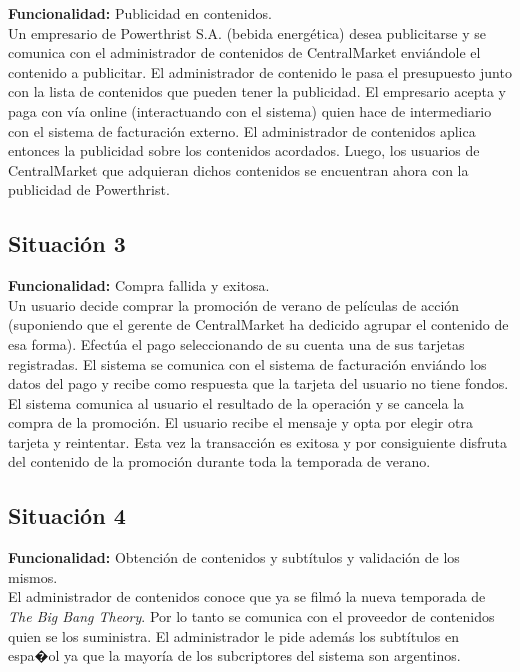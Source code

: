 \documentclass[11pt, a4paper, spanish]{article}
\begin{document}
	\textbf{Funcionalidad:} Publicidad en contenidos.\\

        Un empresario de Powerthrist S.A. (bebida energ\'etica) desea publicitarse y se comunica con el administrador de contenidos de CentralMarket 
    envi\'andole el contenido a publicitar.
    El administrador de contenido le pasa el presupuesto junto con la lista de contenidos que pueden tener la publicidad.
    El empresario acepta y paga con v\'ia online (interactuando con el sistema) quien hace de intermediario con el sistema de facturaci\'on externo.
    El administrador de contenidos aplica entonces la publicidad sobre los contenidos acordados.
    Luego, los usuarios de CentralMarket que adquieran dichos contenidos se encuentran ahora con la publicidad de Powerthrist.

\subsection{Situaci\'on 3}

	\textbf{Funcionalidad:} Compra fallida y exitosa.\\

        Un usuario decide comprar la promoci\'on de verano de pel\'iculas de acci\'on (suponiendo que el gerente de CentralMarket ha dedicido agrupar el     
    contenido de esa forma). Efect\'ua el pago seleccionando de su cuenta una de sus tarjetas registradas. El sistema se comunica con el sistema de 
    facturaci\'on envi\'ando los datos del pago y recibe como respuesta que la tarjeta del usuario no tiene fondos. El sistema comunica al usuario el 
    resultado de la operaci\'on y se cancela la compra de la promoci\'on. El usuario recibe el mensaje y opta por elegir otra tarjeta y reintentar. Esta 
    vez la transacci\'on es exitosa y por consiguiente disfruta del contenido de la promoci\'on durante toda la temporada de verano.

\subsection{Situaci\'on 4}

	\textbf{Funcionalidad:} Obtenci\'on de contenidos y subt\'itulos y validaci\'on de los mismos.\\

        El administrador de contenidos conoce que ya se film\'o la nueva temporada de \emph{The Big Bang Theory}. Por lo tanto se comunica con el 
   proveedor de contenidos quien se los suministra. El administrador le pide adem\'as los subt\'itulos en espa�ol ya que la mayor\'ia de los subcriptores del 
   sistema son argentinos.
\end{document}
